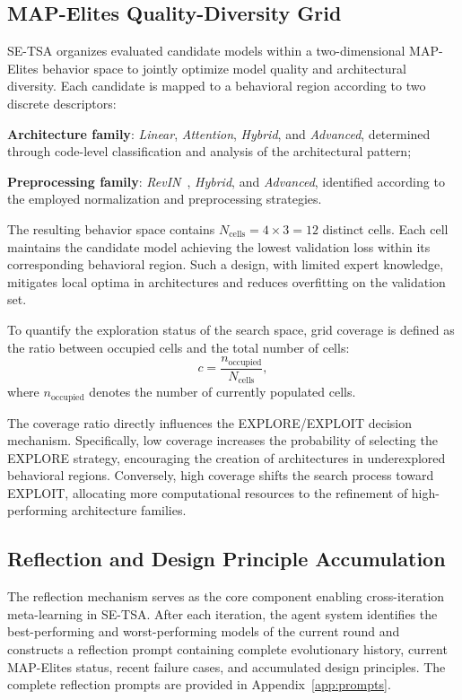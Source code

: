 \subsection{MAP-Elites Quality-Diversity Grid}
\label{method:map_elites}

SE-TSA organizes evaluated candidate models within a two-dimensional MAP-Elites behavior space to jointly optimize model quality and architectural diversity. Each candidate is mapped to a behavioral region according to two discrete descriptors:

\textbf{Architecture family}: \textit{Linear}, \textit{Attention}, \textit{Hybrid}, and \textit{Advanced}, determined through code-level classification and analysis of the architectural pattern;

\textbf{Preprocessing family}: \textit{RevIN}~\cite{RevIN}, \textit{Hybrid}, and \textit{Advanced}, identified according to the employed normalization and preprocessing strategies.

The resulting behavior space contains $N_{\text{cells}} = 4 \times 3 = 12$ distinct cells. Each cell maintains the candidate model achieving the lowest validation loss within its corresponding behavioral region. Such a design, with limited expert knowledge, mitigates local optima in architectures and reduces overfitting on the validation set.

To quantify the exploration status of the search space, grid coverage is defined as the ratio between occupied cells and the total number of cells:
\begin{equation}
c = \frac{n_{\text{occupied}}}{N_{\text{cells}}},
\end{equation}
where $n_{\text{occupied}}$ denotes the number of currently populated cells.

The coverage ratio directly influences the EXPLORE/EXPLOIT decision mechanism. Specifically, low coverage increases the probability of selecting the EXPLORE strategy, encouraging the creation of architectures in underexplored behavioral regions. Conversely, high coverage shifts the search process toward EXPLOIT, allocating more computational resources to the refinement of high-performing architecture families.

\subsection{Reflection and Design Principle Accumulation}

The reflection mechanism serves as the core component enabling cross-iteration meta-learning in SE-TSA. After each iteration, the agent system identifies the best-performing and worst-performing models of the current round and constructs a reflection prompt containing complete evolutionary history, current MAP-Elites status, recent failure cases, and accumulated design principles. The complete reflection prompts are provided in Appendix~\ref{app:prompts}.

